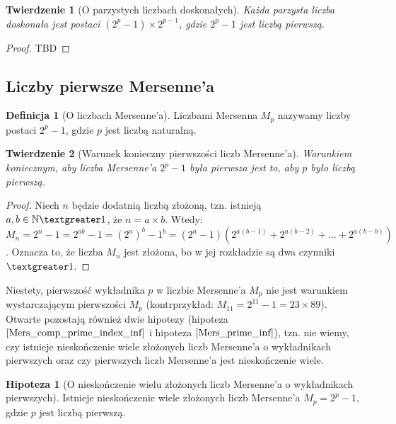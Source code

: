 \documentclass[10pt,onecolumn]{article}
\newtheorem{theorem}{Twierdzenie}
\theoremstyle{definition}
\newtheorem{definition}{Definicja}
\theoremstyle{hypothesis}
\newtheorem{hypothesis}{Hipoteza}
\theoremstyle{capability}
\begin{document}
\begin{theorem}[O parzystych liczbach doskonałych]
Każda parzysta liczba doskonała jest postaci $(2^p - 1) \times 2^{p - 1}$, gdzie $2^p - 1$ jest liczbą pierwszą.
\end{theorem}

\begin{proof}
TBD
\end{proof}

\subsection{Liczby pierwsze Mersenne'a}

\begin{definition} [O liczbach Mersenne'a]
Liczbami Mersenna $M_p$ nazywamy liczby postaci $2^p - 1$, gdzie $p$ jest liczbą naturalną.
\end{definition}

\begin{theorem}[Warunek konieczny pierwszości liczb Mersenne'a]
Warunkiem koniecznym, aby liczba Mersenne'a $2^p - 1$ była pierwsza jest to, aby $p$ było liczbą pierwszą.
\end{theorem}

\begin{proof}
Niech $n$ będzie dodatnią liczbą złożoną, tzn. istnieją $a, b \in \mathbb{N} \textgreater 1$, że $n = a \times b$. Wtedy: $M_n = 2^n - 1 = 2^{ab} - 1 = (2^a)^b - 1^b = (2^a - 1)(2^{a(b - 1)} + 2^{a(b - 2)} + \ldots + 2^{a(b-b)})$. Oznacza to, że liczba $M_n$ jest złożona, bo w jej rozkładzie są dwa czynniki $\textgreater 1$.
\end{proof}

Niestety, pierwszość wykładnika $p$ w liczbie Mersenne'a $M_p$ nie jest warunkiem wystarczającym pierwszości $M_p$ (kontrprzykład: $M_{11} = 2^{11} - 1 = 23 \times 89$). Otwarte pozostają również dwie hipotezy (hipoteza $\ref{Mers_comp_prime_index_inf}$ i hipoteza $\ref{Mers_prime_inf}$), tzn. nie wiemy, czy istnieje nieskończenie wiele złożonych liczb Mersenne'a o wykładnikach pierwszych oraz czy pierwszych liczb Mersenne'a jest nieskończenie wiele.

\begin{hypothesis}[O nieskończenie wielu złożonych liczb Mersenne'a o wykładnikach pierwszych]
Istnieje nieskończenie wiele złożonych liczb Mersenne'a $M_p = 2^p - 1$, gdzie $p$ jest liczbą pierwszą.
\label{Mers_comp_prime_index_inf}
\end{hypothesis}
\end{document}
